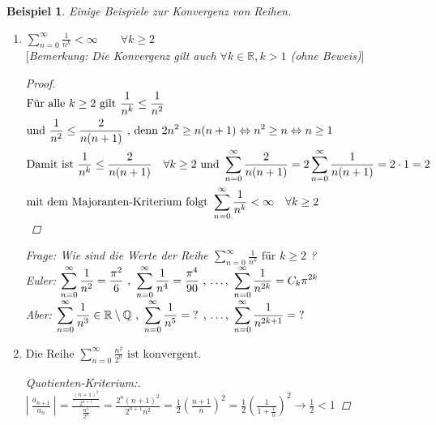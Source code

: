 \documentclass[a4paper,titlepage,oneside]{article}
\def\Q{\ensuremath{\mathbb{Q}} }
\def\R{\ensuremath{\mathbb{R}} }
\def\fa{\ensuremath{\forall}}
\def\sp{\hspace{0,1cm}}
\newcommand{\suminf}[2][n]{\ensuremath{\sum_{#1= 0}^{\infty}{#2}}}
\newcommand{\abs}[1]{\ensuremath{\left|\:#1\:\right|}}
\theoremstyle{thmstyle}
\newtheorem{bsp}[satz]{Beispiel}
\theoremstyle{subthmstyle}
\begin{document}
\begin{bsp}
Einige Beispiele zur Konvergenz von Reihen.
\begin{enumerate}
\item $ \displaystyle \suminf{\frac{1}{n^k}} < \infty \qquad \forall k \ge 2 $\\
$[$Bemerkung: Die Konvergenz gilt auch $\fa k \in \R, k > 1 $ (ohne Beweis)$]$
\begin{proof}
\begin{math}\displaystyle \begin{aligned}[t]
&\text{Für alle }k \ge 2 \text{ gilt } \frac{1}{n^k} \le \frac{1}{n^2} \\
&\text{und } \frac{1}{n^2} \le \frac{2}{n(n+1)} \text{ , denn } 2n^2 \ge n(n+1) \Leftrightarrow n^2 \ge n \Leftrightarrow n \ge 1 \\
&\text{Damit ist } \frac{1}{n^k} \le \frac{2}{n(n+1)} \quad \forall k \ge 2 \text{ und } \suminf{\frac{2}{n(n+1)}} = 2 \suminf{\frac{1}{n(n+1)}} = 2 \cdot 1 = 2 \\
&\text{mit dem Majoranten-Kriterium folgt } \suminf{\frac{1}{n^k}} < \infty \quad \forall k \ge 2
\end{aligned}\\\end{math} 
\end{proof}
Frage: Wie sind die Werte der Reihe $\displaystyle \suminf{\frac{1}{n^k}} \text{ für } k \ge 2 $ ? \\
Euler: $ \displaystyle \suminf{\frac{1}{n^2}} = \frac{\pi^2}{6} \text{ , } \suminf{\frac{1}{n^4}} = \frac{\pi^4}{90} \text{ , \dots , } \suminf{\frac{1}{n^{2k}}} = C_k \pi^{2k}$ \\
Aber: $\displaystyle \suminf{\frac{1}{n^3}} \in \R \setminus \Q \text{ , } \suminf{\frac{1}{n^5}} = \text{? } \text{, \dots , } \suminf{\frac{1}{n^{2k+1}}} = \text{? }$

\item
$\displaystyle \text{Die Reihe } \suminf{\frac{n^2}{2^n}} \text{ ist konvergent.}$

\begin{proof}[Quotienten-Kriterium:]\sp\\
\begin{math}\displaystyle
\abs{\frac{a_{n+1}}{a_n}} = \frac{\frac{(n+1)^2}{2^{n+1}}}{\frac{n^2}{2^n}} = \frac{2^n(n+1)^2}{2^{n+1}n^2} = \frac{1}{2} \left(\frac{n+1}{n}\right)^2 = \frac{1}{2} \left(\frac{1}{1+\frac{1}{n}}\right)^2 \longrightarrow \frac{1}{2} < 1
\end{math}
\end{proof}


\end{enumerate}
\end{bsp}
\end{document}
